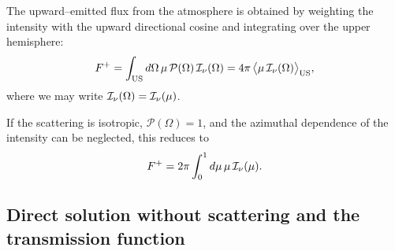The upward–emitted flux from the atmosphere is obtained by weighting the intensity with the upward directional cosine and integrating over the upper hemisphere:
\begin{align}
F^+ = \int_{\mathrm{US}} d\Omega \, \mu \, \mathcal{P}(\Omega)\, {\mathcal{I}_\nu}(\Omega)
= 4\pi \,\big\langle \mu \, {\mathcal{I}_\nu}(\Omega) \big\rangle_\mathrm{US},
\end{align}
where we may write ${\mathcal{I}_\nu}(\Omega) = {\mathcal{I}_\nu}(\mu)$.

If the scattering is isotropic, $\mathcal{P}(\Omega)=1$, and the azimuthal dependence of the intensity can be neglected, this reduces to
\begin{align}
F^+ = 2\pi \int_{0}^{1} d\mu \, \mu \, {\mathcal{I}_\nu}(\mu).
\end{align}

\subsection*{Direct solution without scattering and the transmission function}

